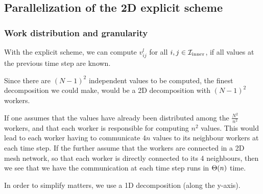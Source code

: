 \subsection{Parallelization of the 2D explicit scheme}
\subsubsection{Work distribution and granularity}
\cite{inf3380_bok}
With the explicit scheme, we can compute $v_{ij}^l$ for all $i, j \in \mathcal{I}_{\mathrm{inner}}$, if all values at the previous time step are known.

Since there are $(N - 1)^2$ independent values to be computed, the finest decomposition we could make, would be a 2D decomposition with $(N - 1)^2$ workers.

If one assumes that the values have already been distributed among the $\frac{N^2}{n^2}$ workers, and that each worker is responsible for computing $n^2$ values. This would lead to each worker having to communicate $4n$ values to its neighbour workers at each time step. If the further assume that the workers are connected in a 2D mesh network, so that each worker is directly connected to its 4 neighbours, then we see that we have the communication at each time step runs in $\Theta (n)$ time.

In order to simplify matters, we use a 1D decomposition (along the y-axis).
